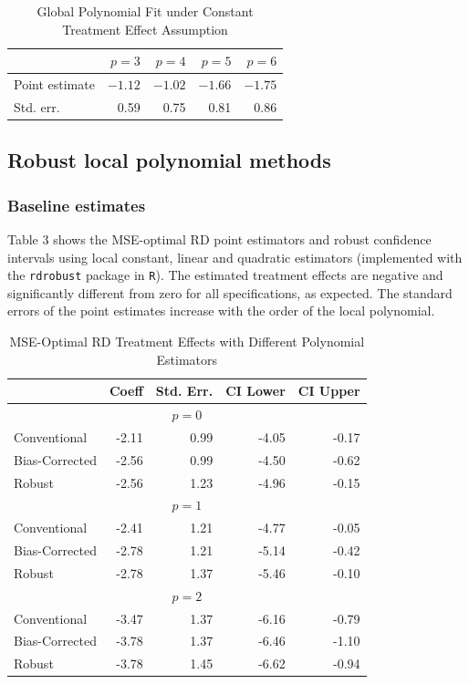 \documentclass[12pt]{article}
\begin{document}
\begin{table}[htpb!]
\centering
\caption{Global Polynomial Fit under Constant Treatment Effect Assumption}
\begin{tabular}{lrrrr}
  \hline
 & $p=3$ & $p=4$ & $p=5$ & $p=6$ \\ 
  \hline
Point estimate& $-1.12$ & $-1.02$ & $-1.66$ & $-1.75$ \\ 
Std. err. & 0.59 & 0.75 & 0.81 & 0.86 \\ 
   \hline
\end{tabular}
\end{table}

\subsection{Robust local polynomial methods}

\subsubsection{Baseline estimates}
Table 3 shows the MSE-optimal RD point estimators and robust confidence intervals using local constant, linear and quadratic estimators (implemented with the \verb|rdrobust| package in \verb|R|). The estimated treatment effects are negative and significantly different from zero for all specifications, as expected. The standard errors of the point estimates increase with the order of the local polynomial.

\begin{table}[htpb!]
\centering
\caption{MSE-Optimal RD Treatment Effects with Different Polynomial Estimators}
\begin{tabular}{lrrrr}
  \hline
 & Coeff & Std. Err. & CI Lower & CI Upper \\ 
  \hline
  \multicolumn{5}{c}{$p=0$}\\
  \hline
Conventional & -2.11 & 0.99 & -4.05 & -0.17 \\ 
  Bias-Corrected & -2.56 & 0.99 & -4.50 & -0.62 \\ 
  Robust & -2.56 & 1.23 & -4.96 & -0.15 \\ 
   \hline
   \multicolumn{5}{c}{$p=1$}\\
     \hline
Conventional & -2.41 & 1.21 & -4.77 & -0.05 \\ 
  Bias-Corrected & -2.78 & 1.21 & -5.14 & -0.42 \\ 
  Robust & -2.78 & 1.37 & -5.46 & -0.10 \\ 
   \hline
\multicolumn{5}{c}{$p=2$}\\
     \hline
Conventional & -3.47 & 1.37 & -6.16 & -0.79 \\ 
  Bias-Corrected & -3.78 & 1.37 & -6.46 & -1.10 \\ 
  Robust & -3.78 & 1.45 & -6.62 & -0.94 \\ 
   \hline
\end{tabular}
\end{table}
\end{document}
